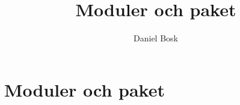 \documentclass[a4paper,10pt,oneside,openright,
               oldfontcommands]{memoir}
\begin{document}
\title{%
  Moduler och paket
}
\author{Daniel Bosk}

\maketitle

\begin{abstract}
  
\end{abstract}

\clearpage

\tableofcontents*

\chapter{Moduler och paket}



\appendix


\printbibliography
\end{document}
